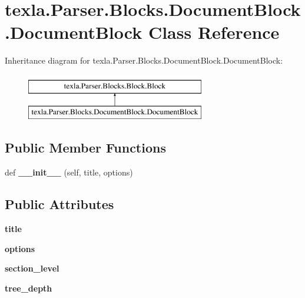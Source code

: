 \hypertarget{classtexla_1_1Parser_1_1Blocks_1_1DocumentBlock_1_1DocumentBlock}{}\section{texla.\+Parser.\+Blocks.\+Document\+Block.\+Document\+Block Class Reference}
\label{classtexla_1_1Parser_1_1Blocks_1_1DocumentBlock_1_1DocumentBlock}
Inheritance diagram for texla.\+Parser.\+Blocks.\+Document\+Block.\+Document\+Block\+:\begin{figure}[H]
\begin{center}
\leavevmode
\includegraphics[height=2.000000cm]{classtexla_1_1Parser_1_1Blocks_1_1DocumentBlock_1_1DocumentBlock}
\end{center}
\end{figure}
\subsection*{Public Member Functions}
\begin{DoxyCompactItemize}
\item 
\hypertarget{classtexla_1_1Parser_1_1Blocks_1_1DocumentBlock_1_1DocumentBlock_a6bda8551b757a0f59387f8e1f61aec00}{}\label{classtexla_1_1Parser_1_1Blocks_1_1DocumentBlock_1_1DocumentBlock_a6bda8551b757a0f59387f8e1f61aec00} 
def {\bfseries \+\_\+\+\_\+init\+\_\+\+\_\+} (self, title, options)
\end{DoxyCompactItemize}
\subsection*{Public Attributes}
\begin{DoxyCompactItemize}
\item 
\hypertarget{classtexla_1_1Parser_1_1Blocks_1_1DocumentBlock_1_1DocumentBlock_a652fe5f9c1b3f599eddf758e12543a15}{}\label{classtexla_1_1Parser_1_1Blocks_1_1DocumentBlock_1_1DocumentBlock_a652fe5f9c1b3f599eddf758e12543a15} 
{\bfseries title}
\item 
\hypertarget{classtexla_1_1Parser_1_1Blocks_1_1DocumentBlock_1_1DocumentBlock_a3ef629c7fc2493d105d83f8a7074e0c0}{}\label{classtexla_1_1Parser_1_1Blocks_1_1DocumentBlock_1_1DocumentBlock_a3ef629c7fc2493d105d83f8a7074e0c0} 
{\bfseries options}
\item 
\hypertarget{classtexla_1_1Parser_1_1Blocks_1_1DocumentBlock_1_1DocumentBlock_a4e881a864dc372efca10e6af0e5b5f61}{}\label{classtexla_1_1Parser_1_1Blocks_1_1DocumentBlock_1_1DocumentBlock_a4e881a864dc372efca10e6af0e5b5f61} 
{\bfseries section\+\_\+level}
\item 
\hypertarget{classtexla_1_1Parser_1_1Blocks_1_1DocumentBlock_1_1DocumentBlock_a686b15909870fcd0b7c96ac8103de12e}{}\label{classtexla_1_1Parser_1_1Blocks_1_1DocumentBlock_1_1DocumentBlock_a686b15909870fcd0b7c96ac8103de12e} 
{\bfseries tree\+\_\+depth}
\end{DoxyCompactItemize}
